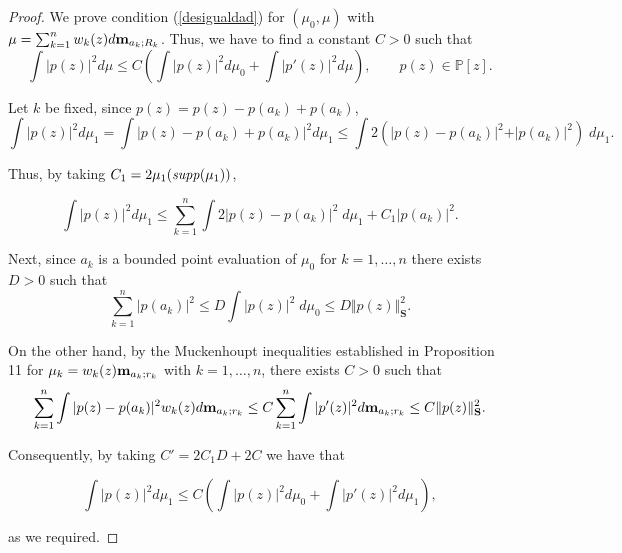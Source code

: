 \documentclass[12pt]{amsart}
\theoremstyle{definition}
\theoremstyle{plain}
\newtheorem{corollary}{Corollary}
\theoremstyle{remark}
\begin{document}
\begin{proof} We prove   condition (\ref{desigualdad}) for $(\mu_0,\mu)$ with   $\mu=\sum_{k=1}^{n} w_k(z)d{\bf  m}_{a_k;R_k}$. Thus, we have to find a constant $C>0$ such that 
$$
\int \vert p(z)\vert^2 d\mu \leq C(\int \vert p(z) \vert^2 d\mu_0+  \int \vert p'(z) \vert^{2} d\mu), \qquad p(z)\in \mathbb{P}[z].
$$

\noindent Let $k$ be fixed, since $p(z)=p(z)-p(a_k)+p(a_k)$, 
$$
\int \vert p(z) \vert^2 d\mu_1=\int \vert p(z) -p(a_k) + p(a_k) \vert^2 d\mu_1 \leq \int 2(\vert p(z) -p(a_k)\vert^2+\vert   p(a_k) \vert^2)\; d\mu_1.
$$

\noindent Thus, by taking $C_1=2\mu_1({\it supp}(\mu_1))$,

$$
\int \vert p(z) \vert^2 d\mu_1 \leq \sum_{k=1}^{n} \int 2\vert p(z) -p(a_k)\vert^2\; d\mu_1 + C_1\vert p(a_k) \vert^2.
$$ 

\noindent Next,  since $a_k$ is a bounded point evaluation of $\mu_0$ for $k=1,\dots,n$ there exists  $D>0$ such that 
$$
\sum_{k=1}^{n} \vert p(a_k) \vert^2 \leq D\int \vert p(z) \vert^2 \; d\mu_0 \leq D\Vert p(z) \Vert^2_{\mathbf{S}}.
$$

\noindent On the other hand, by 
the Muckenhoupt inequalities established in Proposition 11   for $\mu_k=w_k(z){\bf m}_{a_k;r_k}$ with  $k=1,\dots,n$, there exists $C>0$ such that 
$$
\sum_{k=1}^{n} \int \vert p(z) -p(a_k)\vert^2 w_k(z)d {\bf m}_{a_k;r_k} \leq  C \sum_{k=1}^{n} \int  \vert p'(z) \vert^2 d {\bf m}_{a_k;r_k} \leq C\Vert p(z) \Vert^{2
}_{\mathbf{S}}.
$$

\noindent Consequently, by taking $C'=2C_{1}D+2C$ we have that 

$$
\int \vert p(z) \vert^2 d\mu_1 \leq C(\int \vert p(z) \vert^2 d\mu_0+ \int \vert p'(z) \vert^2 d\mu_1 ), 
$$

\noindent as we required. 
\end{proof}


\end{document}
